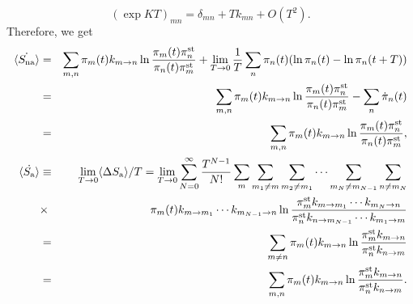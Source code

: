 \documentclass[aps,pre,amsmath,amssymb,floatfix,preprint,nofootinbib]{revtex4}
\begin{document}
\begin{equation}
(\exp K T)_{m n} = \delta_{m n} + T k_{m n} + O(T^2).
\end{equation}
Therefore, we get
\begin{eqnarray}
\langle \dot {S_{\rm na}} \rangle &=&   \sum_{m,n} \pi_m(t) k_{m \to n} \ln \frac{\pi_m (t) \pi^{\rm st}_{n}}{\pi_{n} (t) \pi^{\rm st}_{m}}+ \lim_{T \to 0} \frac{1}{T} \sum_{n} \pi_n(t) (\ln \pi_n (t) - \ln \pi_{n} (t+T) ) \nonumber\\  
&=& \sum_{m,n} \pi_m(t) k_{m \to n} \ln \frac{\pi_m (t) \pi^{\rm st}_{n}}{\pi_{n} (t) \pi^{\rm st}_{m}}- \sum_{n}\dot \pi_n (t)\nonumber\\
&=& \sum_{m,n} \pi_m(t) k_{m \to n} \ln \frac{\pi_m (t) \pi^{\rm st}_{n}}{\pi_{n} (t) \pi^{\rm st}_{m}} ,  \nonumber\\
\langle \dot {S_{\rm a}} \rangle &\equiv& \lim_{T \to 0} \langle \Delta S_{\rm a} \rangle/T =   \lim_{T \to 0}   \sum_{N=0}^\infty \frac{T^{N-1}}{N!} \sum_{m} \sum_{m_1 \ne m} \sum_{m_2 \ne m_1} \cdots \sum_{m_N \ne m_{N-1}} \sum_{n \ne m_{N}}  \nonumber\\
&\times& \pi_m(t) k_{m \to m_1} \cdots k_{m_{N-1} \to n} \ln  \frac{\pi^{\rm st}_{m}   k_{m \to m_1} \cdots k_{m_N \to n} }{\pi^{\rm st}_{n} k_{n \to m_{N-1}} \cdots k_{m_1 \to m} } \nonumber\\
 &=&  \sum_{m \ne n} \pi_m(t) k_{m \to n} \ln  \frac{ \pi^{\rm st}_{m} k_{m \to n} }{\pi^{\rm st}_{n} k_{n \to m} }\nonumber\\
 &=&  \sum_{m, n} \pi_m(t) k_{m \to n} \ln  \frac{ \pi^{\rm st}_{m}  k_{m \to n}  }{\pi^{\rm st}_{n} k_{n \to m} }. \label{sa4}
\end{eqnarray} 
 
\end{document}
